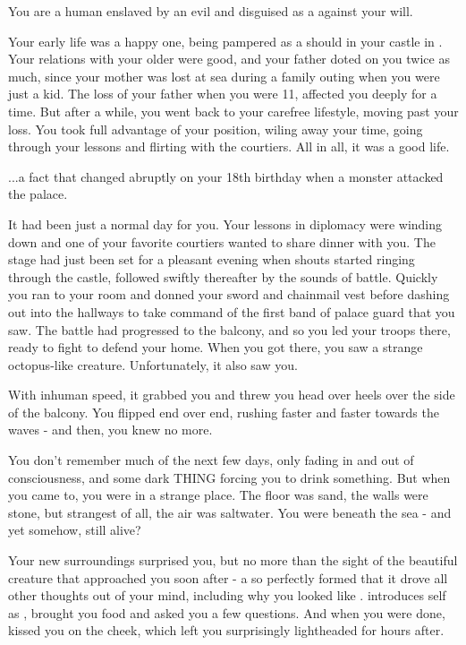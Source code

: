 \documentclass[char]{NeptuneBall}
\begin{document}
\name{\cSlave{}}


You are a human \cSlave{\Prince} enslaved by an evil \cWitch{\magician} and disguised as a \cSlave{\mer} against your will.

Your early life was a happy one, being pampered as a \cSlave{\prince} should in your castle in \pAmerica{}. Your relations with your older \cEric{\sibling} were good, and your father doted on you twice as much, since your mother was lost at sea during a family outing when you were just a kid. The loss of your father when you were 11, affected you deeply for a time. But after a while, you went back to your carefree lifestyle, moving past your loss. You took full advantage of your position, wiling away your time, going through your lessons and flirting with the courtiers. All in all, it was a good life.

...a fact that changed abruptly on your 18th birthday when a monster attacked the palace.

It had been just a normal day for you. Your lessons in diplomacy were winding down and one of your favorite courtiers wanted to share dinner with you. The stage had just been set for a pleasant evening when shouts started ringing through the castle, followed swiftly thereafter by the sounds of battle. Quickly you ran to your room and donned your sword and chainmail vest before dashing out into the hallways to take command of the first band of palace guard that you saw. The battle had progressed to the balcony, and so you led your troops there, ready to fight to defend your home. When you got there, you saw a strange octopus-like creature. Unfortunately, it also saw you.

With inhuman speed, it grabbed you and threw you head over heels over the side of the balcony. You flipped end over end, rushing faster and faster towards the waves - and then, you knew no more.

You don't remember much of the next few days, only fading in and out of consciousness, and some dark THING forcing you to drink something. But when you came to, you were in a strange place. The floor was sand, the walls were stone, but strangest of all, the air was saltwater. You were beneath the sea - and yet somehow, still alive?

Your new surroundings surprised you, but no more than the sight of the beautiful creature that approached you soon after - a \cWitch{\mer} so perfectly formed that it drove all other thoughts out of your mind, including why you looked like \cWitch{\them}. \cWitch{\They} introduces \cWitch{\their}self as \cWitch{}, brought you food and asked you a few questions. And when you were done, \cWitch{\they} kissed you on the cheek, which left you surprisingly lightheaded for hours after.
\end{document}
